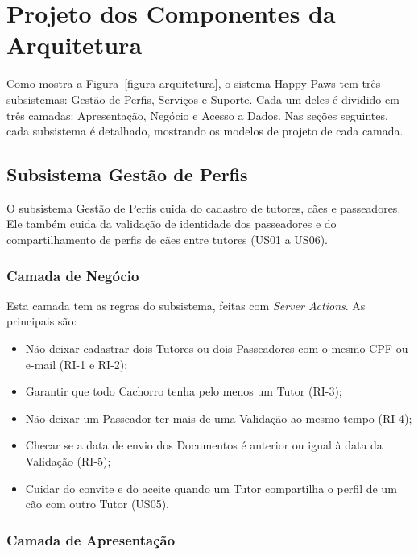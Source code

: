 \chapter{Projeto dos Componentes da Arquitetura}
\label{sec-componentes}
\vspace{-1cm}

Como mostra a Figura~\ref{figura-arquitetura}, o sistema Happy Paws tem três subsistemas: Gestão de Perfis, Serviços e Suporte. Cada um deles é dividido em três camadas: Apresentação, Negócio e Acesso a Dados. Nas seções seguintes, cada subsistema é detalhado, mostrando os modelos de projeto de cada camada.


\section{Subsistema Gestão de Perfis}
\label{sec-componentes-perfis}

O subsistema Gestão de Perfis cuida do cadastro de tutores, cães e passeadores. Ele também cuida da validação de identidade dos passeadores e do compartilhamento de perfis de cães entre tutores (US01 a US06).


\subsection{Camada de Negócio}
\label{sec-componentes-perfis-negocio}

Esta camada tem as regras do subsistema, feitas com \emph{Server Actions}. As principais são:

\begin{itemize}
	\item Não deixar cadastrar dois Tutores ou dois Passeadores com o mesmo CPF ou e-mail (RI-1 e RI-2);
	\item Garantir que todo Cachorro tenha pelo menos um Tutor (RI-3);
	\item Não deixar um Passeador ter mais de uma Validação ao mesmo tempo (RI-4);
	\item Checar se a data de envio dos Documentos é anterior ou igual à data da Validação (RI-5);
	\item Cuidar do convite e do aceite quando um Tutor compartilha o perfil de um cão com outro Tutor (US05).
\end{itemize}


\subsection{Camada de Apresentação}
\label{sec-componentes-perfis-apresentacao}

